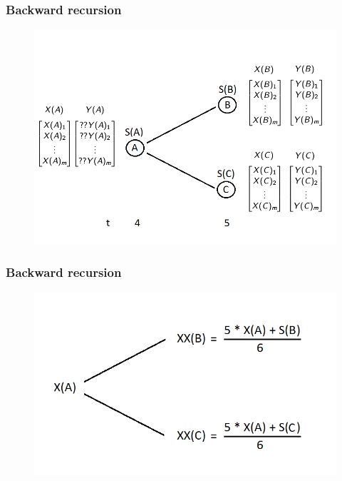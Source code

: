 \documentclass{beamer}
\begin{document}
\begin{frame}
\frametitle{Backward recursion}
\begin{figure}[T]
	\includegraphics[scale=0.55]{backwardtree1}
\end{figure}
\end{frame}

\begin{frame}
\frametitle{Backward recursion}
\begin{figure}[T]
	\includegraphics[scale=0.55]{backwardtree2}
\end{figure}
\end{frame}
\end{document}
